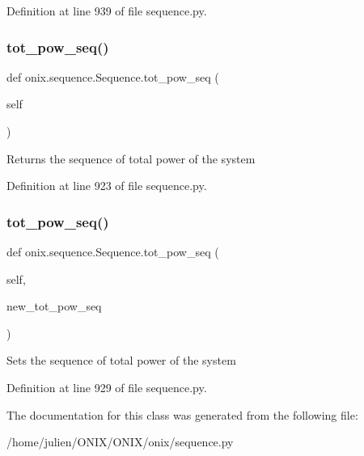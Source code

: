 Definition at line 939 of file sequence.\+py.

\mbox{\label{classonix_1_1sequence_1_1Sequence_a486a4d2cae250caed5c2ca84adb09c74}} 
\subsubsection{\texorpdfstring{tot\+\_\+pow\+\_\+seq()}{tot\_pow\_seq()}\hspace{0.1cm}{\footnotesize\ttfamily [1/2]}}
{\footnotesize\ttfamily def onix.\+sequence.\+Sequence.\+tot\+\_\+pow\+\_\+seq (\begin{DoxyParamCaption}\item[{}]{self }\end{DoxyParamCaption})}

\begin{DoxyVerb}Returns the sequence of total power of the system
\end{DoxyVerb}
 

Definition at line 923 of file sequence.\+py.

\mbox{\label{classonix_1_1sequence_1_1Sequence_a7e4da78acea29975929ca4dbded27daa}} 
\subsubsection{\texorpdfstring{tot\+\_\+pow\+\_\+seq()}{tot\_pow\_seq()}\hspace{0.1cm}{\footnotesize\ttfamily [2/2]}}
{\footnotesize\ttfamily def onix.\+sequence.\+Sequence.\+tot\+\_\+pow\+\_\+seq (\begin{DoxyParamCaption}\item[{}]{self,  }\item[{}]{new\+\_\+tot\+\_\+pow\+\_\+seq }\end{DoxyParamCaption})}

\begin{DoxyVerb}Sets the sequence of total power of the system
\end{DoxyVerb}
 

Definition at line 929 of file sequence.\+py.



The documentation for this class was generated from the following file\+:\begin{DoxyCompactItemize}
\item 
/home/julien/\+O\+N\+I\+X/\+O\+N\+I\+X/onix/sequence.\+py\end{DoxyCompactItemize}
